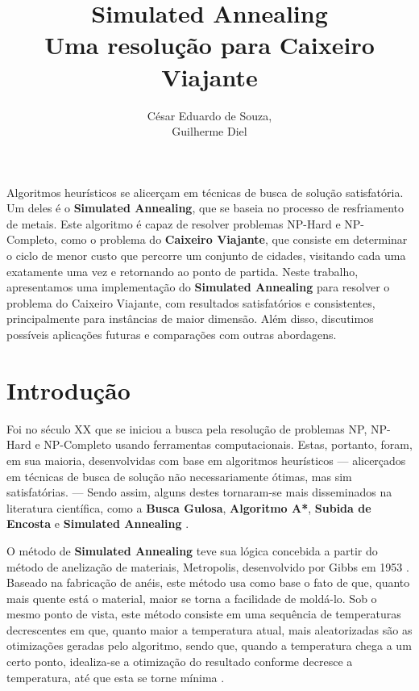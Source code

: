 \documentclass[12pt]{article}
\title{Simulated Annealing\\ Uma resolução para Caixeiro Viajante}
\author{César Eduardo de Souza\inst{1},\\ Guilherme Diel\inst{1}}
\begin{document}
 

\maketitle

     
\begin{resumo} 
  Algoritmos heurísticos se alicerçam em técnicas de busca de solução satisfatória. Um deles é o \textbf{Simulated Annealing}, que se baseia no processo de resfriamento de metais. Este algoritmo é capaz de resolver problemas NP-Hard e NP-Completo, como o problema do \textbf{Caixeiro Viajante}, que consiste em determinar o ciclo de menor custo que percorre um conjunto de cidades, visitando cada uma exatamente uma vez e retornando ao ponto de partida. Neste trabalho, apresentamos uma implementação do \textbf{Simulated Annealing} para resolver o problema do Caixeiro Viajante, com resultados satisfatórios e consistentes, principalmente para instâncias de maior dimensão. Além disso, discutimos possíveis aplicações futuras e comparações com outras abordagens.
\end{resumo}


\section{Introdução}
\label{sec:introducao}
Foi no século XX que se iniciou a busca pela resolução de problemas NP, NP-Hard e NP-Completo usando ferramentas computacionais. 
%
Estas, portanto, foram, em sua maioria, desenvolvidas com base em algoritmos heurísticos — alicerçados em técnicas de busca de solução não necessariamente ótimas, mas sim satisfatórias. — 
%
Sendo assim, alguns destes tornaram-se mais disseminados na literatura científica, como a \textbf{Busca Gulosa}, \textbf{Algoritmo A*}, \textbf{Subida de Encosta} e \textbf{Simulated Annealing} \cite{kokashHeuristicIntro}.

O método de \textbf{Simulated Annealing} teve sua lógica concebida a partir do método de anelização de materiais, Metropolis, desenvolvido por Gibbs em 1953 \cite{metropolis1953equation}.
%
Baseado na fabricação de anéis, este método usa como base o fato de que, quanto mais quente está o material, maior se torna a facilidade de moldá-lo.%
Sob o mesmo ponto de vista, este método consiste em uma sequência de temperaturas decrescentes em que, quanto maior a temperatura atual, mais aleatorizadas são as otimizações geradas pelo algoritmo, sendo que, quando a temperatura chega a um certo ponto, idealiza-se a otimização do resultado conforme decresce a temperatura, até que esta se torne mínima \cite{bertsimas1993simulated}.
\end{document}
